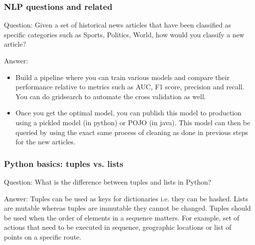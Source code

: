 \documentclass[11pt]{beamer}
\begin{document}
\begin{frame}
\frametitle{NLP questions and related}
\begin{block}{Question:}
	Given a set of historical news articles that have been classified as specific categories such as Sports, Politics, World, how would you classify a new article?
\end{block}
\begin{block}{Answer:}
	\begin{itemize}
		\item Build a pipeline where you can train various models and compare their performance relative to metrics such as AUC, F1 score, precision and recall. You can do gridsearch to automate the cross validation as well.
		\item Once you get the optimal model, you can publish this model to production using a pickled model (in python) or POJO (in java). This model can then be queried by using the exact same process of cleaning as done in previous steps for the new articles.
	\end{itemize}
\end{block}
\end{frame}

\begin{frame}
\frametitle{Python basics: tuples vs. lists}
\begin{block}{Question:}
	What is the difference between tuples and lists in Python?
\end{block}
\begin{block}{Answer:}
	Tuples can be used as keys for dictionaries i.e. they can be hashed. Lists are mutable whereas tuples are immutable  they cannot be changed. Tuples should be used when the order of elements in a sequence matters. For example, set of actions that need to be executed in sequence, geographic locations or list of points on a specific route.
\end{block}
\end{frame}
\end{document}

